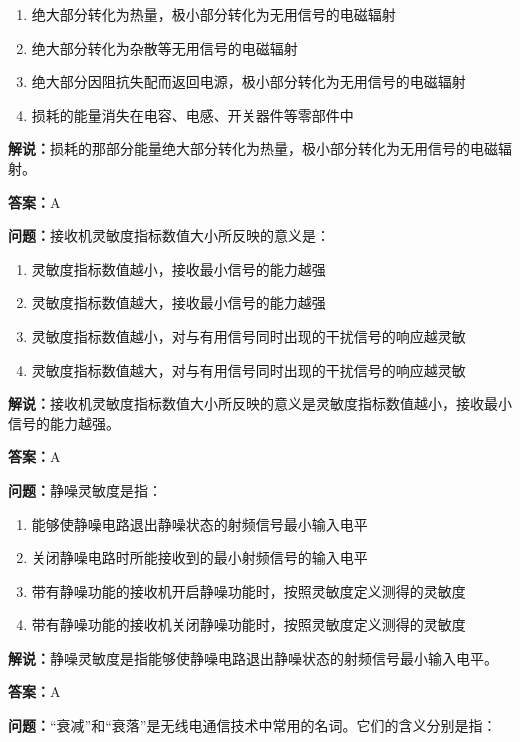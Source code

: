 \begin{enumerate}[label=\Alph*), leftmargin=1cm]
	\item 绝大部分转化为热量，极小部分转化为无用信号的电磁辐射
	\item 绝大部分转化为杂散等无用信号的电磁辐射
	\item 绝大部分因阻抗失配而返回电源，极小部分转化为无用信号的电磁辐射
	\item 损耗的能量消失在电容、电感、开关器件等零部件中
\end{enumerate}

\textbf{解说：}损耗的那部分能量绝大部分转化为热量，极小部分转化为无用信号的电磁辐射。%

\textbf{答案：}A

\textbf{问题：}接收机灵敏度指标数值大小所反映的意义是：

\begin{enumerate}[label=\Alph*), leftmargin=1cm]
	\item 灵敏度指标数值越小，接收最小信号的能力越强
	\item 灵敏度指标数值越大，接收最小信号的能力越强
	\item 灵敏度指标数值越小，对与有用信号同时出现的干扰信号的响应越灵敏
	\item 灵敏度指标数值越大，对与有用信号同时出现的干扰信号的响应越灵敏
\end{enumerate}

\textbf{解说：}接收机灵敏度指标数值大小所反映的意义是灵敏度指标数值越小，接收最小信号的能力越强。%

\textbf{答案：}A

\textbf{问题：}静噪灵敏度是指：

\begin{enumerate}[label=\Alph*), leftmargin=1cm]
	\item 能够使静噪电路退出静噪状态的射频信号最小输入电平
	\item 关闭静噪电路时所能接收到的最小射频信号的输入电平
	\item 带有静噪功能的接收机开启静噪功能时，按照灵敏度定义测得的灵敏度
	\item 带有静噪功能的接收机关闭静噪功能时，按照灵敏度定义测得的灵敏度
\end{enumerate}

\textbf{解说：}静噪灵敏度是指能够使静噪电路退出静噪状态的射频信号最小输入电平。%

\textbf{答案：}A

\textbf{问题：}“衰减”和“衰落”是无线电通信技术中常用的名词。它们的含义分别是指：


